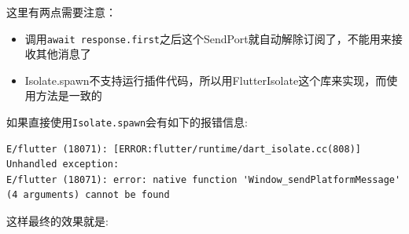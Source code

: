 \documentclass[12pt]{article}
\begin{document}
\begin{Shaded}
\begin{Highlighting}[]
  \OperatorTok{\textless{}}\OperatorTok{\textgreater{}}\OperatorTok{,} \OperatorTok{\{}
    \OperatorTok{=}
    \OperatorTok{=} \OperatorTok{,}
    \OperatorTok{=} 
    \OperatorTok{=}
\NormalTok{send([response1}\OperatorTok{,}\OperatorTok{,}\NormalTok{encode(salt)]);}
     \OperatorTok{=} 


  \OperatorTok{\}}
\OperatorTok{\}}
\end{Highlighting}
\end{Shaded}

这里有两点需要注意：

\begin{itemize}
\tightlist
\item
  调用\texttt{await\ response.first}之后这个SendPort就自动解除订阅了，不能用来接收其他消息了
\item
  Isolate.spawn不支持运行插件代码，所以用FlutterIsolate这个库来实现，而使用方法是一致的
\end{itemize}

如果直接使用\texttt{Isolate.spawn}会有如下的报错信息:

\begin{verbatim}
E/flutter (18071): [ERROR:flutter/runtime/dart_isolate.cc(808)] Unhandled exception:
E/flutter (18071): error: native function 'Window_sendPlatformMessage' (4 arguments) cannot be found
\end{verbatim}

这样最终的效果就是:
\end{document}
